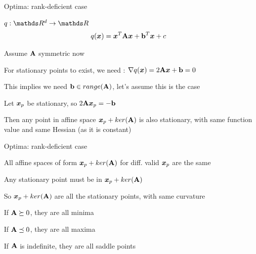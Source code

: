 \documentclass[11pt,compress,t,notes=noshow, xcolor=table]{beamer}
\begin{document}
\begin{framei}[fs=footnotesize]{Optima: rank-deficient case}
\item $q: \R^d \to \R$
$$ q(\bm{x}) = \bm{x}^T \mathbf{A} \bm{x} + \mathbf{b}^T \bm{x} + c $$
\item Assume $\mathbf{A}$ symmetric now
\item For stationary points to exist, we need : $\nabla q(\bm{x}) = 2 \mathbf{A} \bm{x} + \mathbf{b} = 0$
\item This implies we need $\mathbf{b} \in range(\mathbf{A})$, let's assume this is the case
\item Let $\bm{x}_p$ be stationary, so $2 \mathbf{A} \bm{x}_p = -\mathbf{b}$
\item Then any point in affine space $\bm{x}_p + ker(\mathbf{A})$ is also stationary, with same function value and same Hessian (as it is constant)
\end{framei}


\begin{framei}[fs=footnotesize]{Optima: rank-deficient case}
\item All affine spaces of form $\bm{x}_p + ker(\mathbf{A})$ for diff. valid $\bm{x}_p$ are the same
\item Any stationary point must be in $\bm{x}_p + ker(\mathbf{A})$
\item So $\bm{x}_p + ker(\mathbf{A})$ are all the stationary points, with same curvature
\item If $\mathbf{A} \succeq 0$, they are all minima
\item If $\mathbf{A} \preceq 0$, they are all maxima
\item If $\mathbf{A}$ is indefinite, they are all saddle points
\end{framei}


\end{document}
